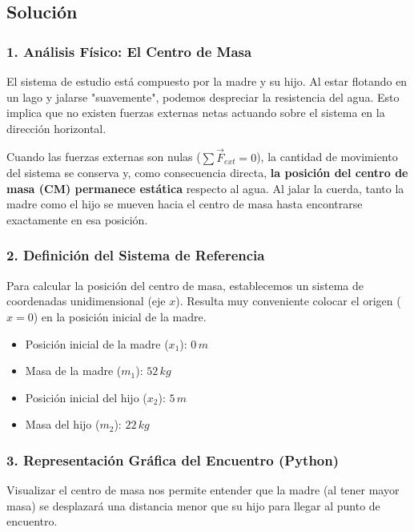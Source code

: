 \documentclass[12pt, a4paper]{article}
\begin{document}
\subsection*{Solución}

\subsubsection*{1. Análisis Físico: El Centro de Masa}
El sistema de estudio está compuesto por la madre y su hijo. Al estar flotando en un lago y jalarse "suavemente", podemos despreciar la resistencia del agua. Esto implica que no existen fuerzas externas netas actuando sobre el sistema en la dirección horizontal.

Cuando las fuerzas externas son nulas ($\sum \vec{F}_{ext} = 0$), la cantidad de movimiento del sistema se conserva y, como consecuencia directa, \textbf{la posición del centro de masa (CM) permanece estática} respecto al agua. Al jalar la cuerda, tanto la madre como el hijo se mueven hacia el centro de masa hasta encontrarse exactamente en esa posición.

\subsubsection*{2. Definición del Sistema de Referencia}
Para calcular la posición del centro de masa, establecemos un sistema de coordenadas unidimensional (eje $x$). Resulta muy conveniente colocar el origen ($x=0$) en la posición inicial de la madre.
\begin{itemize}
    \item Posición inicial de la madre ($x_1$): $0 \, \si{m}$
    \item Masa de la madre ($m_1$): $52 \, \si{kg}$
    \item Posición inicial del hijo ($x_2$): $5 \, \si{m}$
    \item Masa del hijo ($m_2$): $22 \, \si{kg}$
\end{itemize}

\subsubsection*{3. Representación Gráfica del Encuentro (Python)}
Visualizar el centro de masa nos permite entender que la madre (al tener mayor masa) se desplazará una distancia menor que su hijo para llegar al punto de encuentro.
\end{document}
